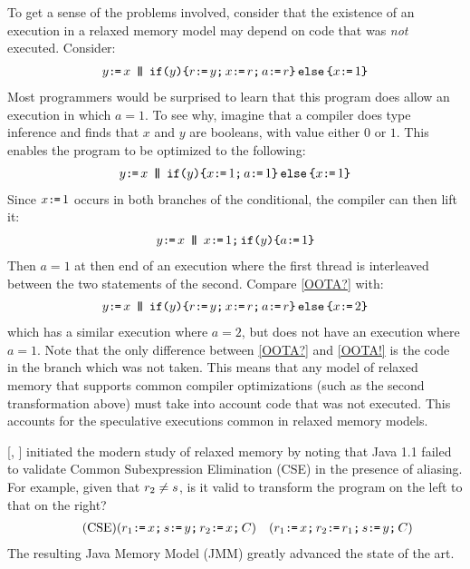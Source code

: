 To get a sense of the problems involved,
consider that the existence of an execution in a relaxed memory model may
depend on code that was \emph{not} executed. Consider:
\begin{gather}
  \label{OOTA?}
    y\GETS x
  \PAR
    \IF{y}\THEN r\GETS y\SEMI x\GETS r\SEMI a\GETS r \ELSE x\GETS1 \FI
\end{gather}
Most programmers would be surprised to learn that this program does allow an
execution in which $a=1$. To see why, imagine that a compiler does type
inference and finds that $x$ and $y$ are booleans, with value either $0$ or
$1$.  This enables the program to be optimized to the following:
\begin{gather*}
    y\texttt{:}\mkern-1mu\texttt{=}\, x
  \,\mathbin{\texttt{\textbf{|}}\mkern-6mu\texttt{\textbf{|}}}\,
    \texttt{if}\allowbreak\texttt{(}y\texttt{)}\allowbreak\texttt{\{} x\texttt{:}\mkern-1mu\texttt{=}\, 1\texttt{;}\,\allowbreak a\texttt{:}\mkern-1mu\texttt{=}\, 1 \texttt{\}}\,\allowbreak\texttt{else}\allowbreak\,\texttt{\{} x\texttt{:}\mkern-1mu\texttt{=}\,1 \texttt{\}}
\end{gather*}
Since $x\texttt{:}\mkern-1mu\texttt{=}\,1$ occurs in both branches of the conditional, the compiler can
then lift it:
\begin{gather*}
    y\texttt{:}\mkern-1mu\texttt{=}\, x
  \,\mathbin{\texttt{\textbf{|}}\mkern-6mu\texttt{\textbf{|}}}\,
    x\texttt{:}\mkern-1mu\texttt{=}\,1\texttt{;}\,\allowbreak \texttt{if}\allowbreak\texttt{(}y\texttt{)}\allowbreak\texttt{\{} a\texttt{:}\mkern-1mu\texttt{=}\, 1 \texttt{\}}
\end{gather*}
Then $a=1$ at then end of an execution where the first thread is interleaved
between the two statements of the second.  Compare \eqref{OOTA?} with:
\begin{gather}
  \label{OOTA!}
    y\GETS x
  \PAR
    \IF{y}\THEN r\GETS y\SEMI x\GETS r\SEMI a\GETS r \ELSE x\GETS2 \FI
\end{gather}
which has a similar execution where $a=2$, but does not have an execution
where $a=1$. Note that the only difference between \ref{OOTA?} and
\ref{OOTA!} is the code in the branch which was not taken. This means that
any model of relaxed memory that supports common compiler optimizations (such
as the second transformation above) must take into account code that was not
executed. This accounts for the speculative executions common in relaxed
memory models.



\citeauthor{DBLP:conf/java/Pugh99} [\citeyear{DBLP:conf/java/Pugh99},
] initiated the modern study of relaxed memory by noting that
Java 1.1 failed to validate Common Subexpression Elimination (CSE) in the
presence of aliasing. For example, given that $r_2\neq s$, is it valid
to transform the program on the left to that on the right?
\begin{align*}
  \tag{CSE}\label{CSE}
  ({r_1\texttt{:}\mkern-1mu\texttt{=}\, x \texttt{;}\,\allowbreak
  s\texttt{:}\mkern-1mu\texttt{=}\, y \texttt{;}\,\allowbreak  
  r_2\texttt{:}\mkern-1mu\texttt{=}\, x\texttt{;}\,\allowbreak C})
&&
  ({r_1\texttt{:}\mkern-1mu\texttt{=}\, x \texttt{;}\,\allowbreak     
    r_2\texttt{:}\mkern-1mu\texttt{=}\, r_1\texttt{;}\,\allowbreak
    s\texttt{:}\mkern-1mu\texttt{=}\, y \texttt{;}\,\allowbreak C})
\end{align*}
The resulting Java Memory Model (JMM) \cite{Manson:2005:JMM:1047659.1040336}
greatly advanced the state of the art.


